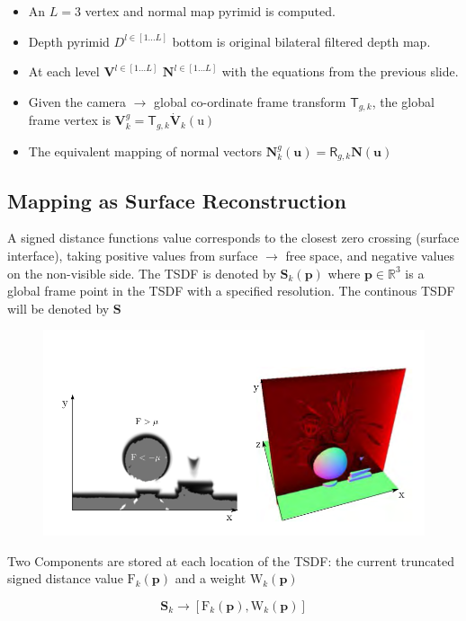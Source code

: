 \documentclass[10pt,twocolumn]{article}
\begin{document}
\begin{itemize}
\item An $L = 3$ vertex and normal map pyrimid is computed.
\item Depth pyrimid $D^{l \in[1\dots L]}$ bottom is original bilateral filtered depth map. 
\item At each level $\textbf{V}^{l \in[1\dots L]}$ $\textbf{N}^{l \in[1\dots L]}$ with the equations from the previous slide.
\item Given the camera $\rightarrow$ global co-ordinate frame transform $\mathsf{T}_{g,k}$, the global frame vertex is $\textbf{V}^{g}_{k} = \mathsf{T}_{g,k} \dot{\textbf{V}}_{k}(\mathrm{u})$
\item The equivalent mapping of normal vectors $\mathbf{N}^{g}_{k}(\mathbf{u}) = \mathsf{R}_{g,k}\mathbf{N}(\mathbf{u})$
\end{itemize}

\subsection{Mapping as Surface Reconstruction}
  A signed distance functions value corresponds to the closest zero crossing (surface interface), taking positive values from surface $\rightarrow$ free space, and negative values on the non-visible side.
  The TSDF is denoted by $\mathbf{S}_{k}(\mathbf{p})$ where $\mathbf{p} \in \mathbb{R}^{3}$ is a global frame point in the TSDF with a specified resolution. The continous TSDF will be denoted by $\mathbf{S}$

\begin{figure}
\includegraphics[width=0.8\linewidth]{tsdf}
\end{figure}

Two Components are stored at each location of the TSDF: the current truncated signed distance value $\mathrm{F}_{k}(\mathbf{p})$ and a weight $\mathrm{W}_k(\mathbf{p})$

$$
\mathbf{S}_{k} \rightarrow [\mathrm{F}_{k}(\mathbf{p}), \mathrm{W}_{k}(\mathbf{p})]
$$
\end{document}
